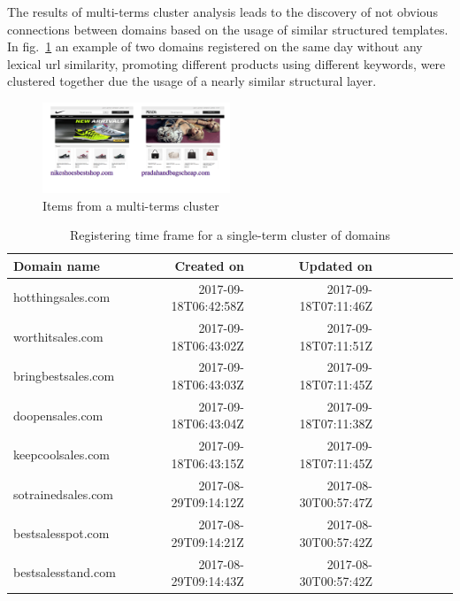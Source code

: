 \documentclass{easychair}
\begin{document}
	The results of multi-terms cluster analysis leads to the discovery of not obvious connections between domains based on the usage of similar structured templates. In fig.~\ref{fig:6} an example of two domains registered on the same day without any lexical url similarity, promoting different products using different keywords, were clustered together due the usage of a nearly similar structural layer. 
\begin{figure}[ht]
  \begin{centering}
  \includegraphics[width=0.5\textwidth]{6.png}
  \caption{Items from a multi-terms cluster}
  \label{fig:6}
  \end{centering}
\end{figure}


\begin{table}[htp]
  \begin{centering}
    \begin{tabular}{lrrrrrrrr}
    \hline
    Domain name           & Created on & Updated on \\
                          
    \hline
    hotthingsales.com       &  2017-09-18T06:42:58Z & 2017-09-18T07:11:46Z  \\
   
    worthitsales.com      &  2017-09-18T06:43:02Z & 2017-09-18T07:11:51Z  \\
    

       bringbestsales.com   & 2017-09-18T06:43:03Z  &  2017-09-18T07:11:45Z \\
    
      doopensales.com    & 2017-09-18T06:43:04Z  &  2017-09-18T07:11:38Z \\
   
      keepcoolsales.com    & 2017-09-18T06:43:15Z  &  2017-09-18T07:11:45Z  \\
    
       sotrainedsales.com    &  2017-08-29T09:14:12Z & 2017-08-30T00:57:47Z   \\
  
        bestsalesspot.com  & 2017-08-29T09:14:21Z  & 2017-08-30T00:57:42Z  \\
  
    
    
        bestsalesstand.com  &  2017-08-29T09:14:43Z & 2017-08-30T00:57:42Z   \\
    \hline  
    
    \end{tabular}
    \caption{Registering time frame for a single-term cluster of domains }
    \label{tab:table2}
  \end{centering}
\end{table}
\end{document}
